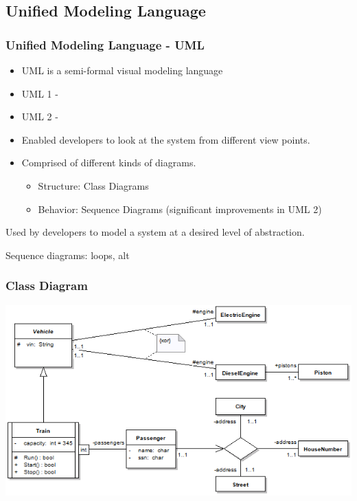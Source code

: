 \subsection{Unified Modeling Language}
%
%
\frame
{
  \frametitle{Unified Modeling Language - UML}

	\begin{itemize}
  		\item<1-> UML is a semi-formal visual modeling language
		\item UML 1 - 
		\item UML 2 -
  		\item<2-> Enabled developers to look at the system from different view points.
  		\item<3-> Comprised of different kinds of diagrams.
		\begin{itemize}
				\item Structure: Class Diagrams
				\item Behavior: Sequence Diagrams (significant improvements in UML 2)
		\end{itemize}
  		 
	  	
  \end{itemize}

}

\note
{
Used by developers to model a system at a desired level of abstraction.

Sequence diagrams: loops, alt

}


%
%
\frame
{
  \frametitle{Class Diagram}

\begin{center}

\includegraphics[width=\textwidth]{images/ClassDiagramOverview.png}

\end{center}
}

